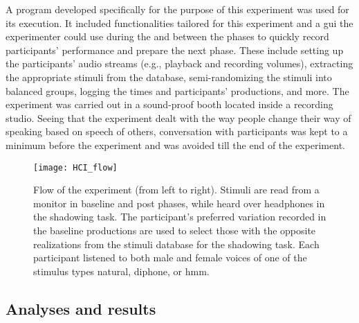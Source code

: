 A program developed specifically for the purpose of this experiment was used for its execution.
It included functionalities tailored for this experiment and a \ac{gui} the experimenter could use during the and between the phases to quickly record participants' performance and prepare the next phase.
These include setting up the participants' audio streams (e.g., playback and recording volumes), extracting the appropriate stimuli from the database, semi-randomizing the stimuli into balanced groups, logging the times and participants' productions, and more.
The experiment was carried out in a sound-proof booth located inside a recording studio.
Seeing that the experiment dealt with the way people change their way of speaking based on speech of others, conversation with participants was kept to a minimum before the experiment and was avoided till the end of the experiment.
%
\begin{figure}[t]
	\centering
	\texttt{[image: HCI\_flow]}
	\caption[\acs{hci} convergence experiment workflow]
		{Flow of the experiment (from left to right).
		Stimuli are read from a monitor in baseline and post phases, while heard over headphones in the shadowing task.
		The participant's preferred variation recorded in the baseline productions are used to select those with the opposite realizations from the stimuli database for the shadowing task.
		Each participant listened to both male and female voices of one of the stimulus types natural, diphone, or \acs{hmm}.}
	\label{fig:HCIConvFlow}
\end{figure}

\subsection{Analyses and results}
\label{subsec:results_hci}

